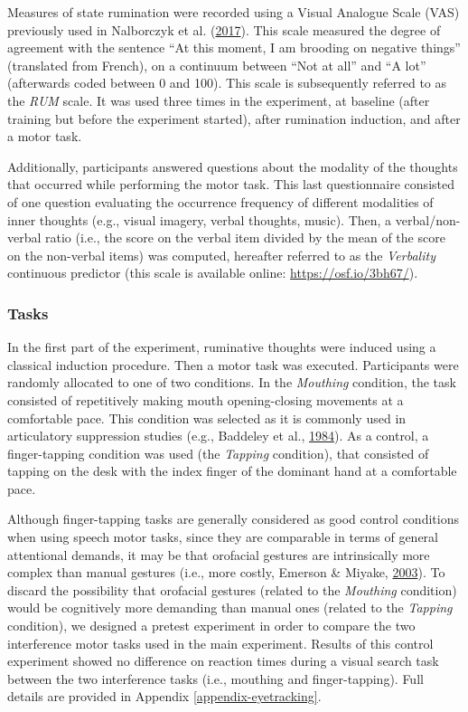 \documentclass[a4paper,12pt,twoside,openright,oldfontcommands]{memoir}
\begin{document}
Measures of state rumination were recorded using a Visual Analogue Scale (VAS) previously used in Nalborczyk et al. (\protect\hyperlink{ref-nalborczyk_orofacial_2017}{2017}). This scale measured the degree of agreement with the sentence \enquote{At this moment, I am brooding on negative things} (translated from French), on a continuum between \enquote{Not at all} and \enquote{A lot} (afterwards coded between 0 and 100). This scale is subsequently referred to as the \emph{RUM} scale. It was used three times in the experiment, at baseline (after training but before the experiment started), after rumination induction, and after a motor task.

Additionally, participants answered questions about the modality of the thoughts that occurred while performing the motor task. This last questionnaire consisted of one question evaluating the occurrence frequency of different modalities of inner thoughts (e.g., visual imagery, verbal thoughts, music). Then, a verbal/non-verbal ratio (i.e., the score on the verbal item divided by the mean of the score on the non-verbal items) was computed, hereafter referred to as the \emph{Verbality} continuous predictor (this scale is available online: \url{https://osf.io/3bh67/}).

\hypertarget{tasks}{%
\subsubsection{Tasks}\label{tasks}}

In the first part of the experiment, ruminative thoughts were induced using a classical induction procedure. Then a motor task was executed. Participants were randomly allocated to one of two conditions. In the \emph{Mouthing} condition, the task consisted of repetitively making mouth opening-closing movements at a comfortable pace. This condition was selected as it is commonly used in articulatory suppression studies (e.g., Baddeley et al., \protect\hyperlink{ref-baddeley_exploring_1984}{1984}). As a control, a finger-tapping condition was used (the \emph{Tapping} condition), that consisted of tapping on the desk with the index finger of the dominant hand at a comfortable pace.

Although finger-tapping tasks are generally considered as good control conditions when using speech motor tasks, since they are comparable in terms of general attentional demands, it may be that orofacial gestures are intrinsically more complex than manual gestures (i.e., more costly, Emerson \& Miyake, \protect\hyperlink{ref-emerson_role_2003}{2003}). To discard the possibility that orofacial gestures (related to the \emph{Mouthing} condition) would be cognitively more demanding than manual ones (related to the \emph{Tapping} condition), we designed a pretest experiment in order to compare the two interference motor tasks used in the main experiment. Results of this control experiment showed no difference on reaction times during a visual search task between the two interference tasks (i.e., mouthing and finger-tapping). Full details are provided in Appendix \ref{appendix-eyetracking}.
\end{document}
